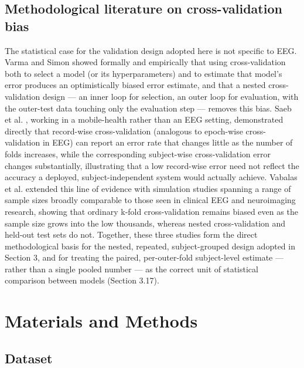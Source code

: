 \documentclass[a4paper,fleqn]{cas-sc}
\begin{document}
\subsection{Methodological literature on cross-validation bias}

The statistical case for the validation design adopted here is not specific to EEG. Varma and Simon \cite{varma2006bias} showed formally and empirically that using cross-validation both to select a model (or its hyperparameters) and to estimate that model's error produces an optimistically biased error estimate, and that a nested cross-validation design --- an inner loop for selection, an outer loop for evaluation, with the outer-test data touching only the evaluation step --- removes this bias. Saeb et al. \cite{saeb2017need}, working in a mobile-health rather than an EEG setting, demonstrated directly that record-wise cross-validation (analogous to epoch-wise cross-validation in EEG) can report an error rate that changes little as the number of folds increases, while the corresponding subject-wise cross-validation error changes substantially, illustrating that a low record-wise error need not reflect the accuracy a deployed, subject-independent system would actually achieve. Vabalas et al. \cite{vabalas2019machine} extended this line of evidence with simulation studies spanning a range of sample sizes broadly comparable to those seen in clinical EEG and neuroimaging research, showing that ordinary k-fold cross-validation remains biased even as the sample size grows into the low thousands, whereas nested cross-validation and held-out test sets do not. Together, these three studies form the direct methodological basis for the nested, repeated, subject-grouped design adopted in Section 3, and for treating the paired, per-outer-fold subject-level estimate --- rather than a single pooled number --- as the correct unit of statistical comparison between models (Section 3.17).



\section{Materials and Methods}

\subsection{Dataset}
\end{document}

